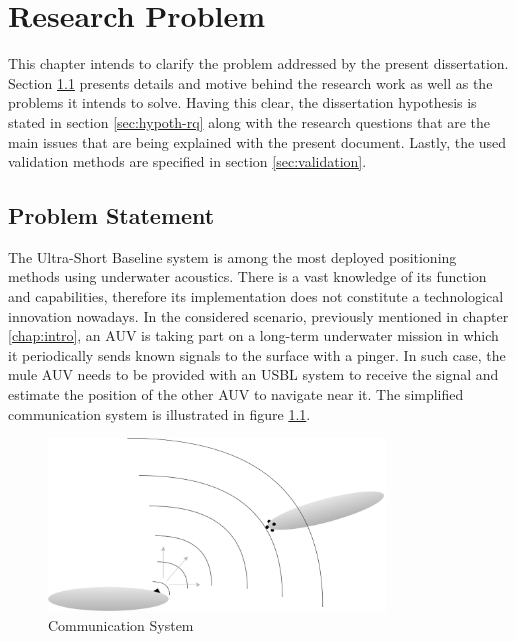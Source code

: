\chapter{Research Problem} \label{chap:problem}

This chapter intends to clarify the problem addressed by the present dissertation. Section \ref{sec:prob-state} presents details and motive behind the research work as well as the problems it intends to solve. Having this clear, the dissertation hypothesis is stated in section \ref{sec:hypoth-rq} along with the research questions that are the main issues that are being explained with the present document. Lastly, the used validation methods are specified in section \ref{sec:validation}.

\section{Problem Statement} \label{sec:prob-state}

The Ultra-Short Baseline system is among the most deployed positioning methods using underwater acoustics. There is a vast knowledge of its function and capabilities, therefore its implementation does not constitute a technological innovation nowadays. 
In the considered scenario, previously mentioned in chapter \ref{chap:intro}, an AUV is taking part on a long-term underwater mission in which it periodically sends known signals to the surface with a pinger. In such case, the mule AUV needs to be provided with an USBL system to receive the signal and estimate the position of the other AUV to navigate near it. The simplified communication system is illustrated in figure \ref{fig:auv_scene}. 

\begin{figure}[!htbp]
	\centering
	\includegraphics[width=0.8\textwidth]{figures/proposed-solution}
	\caption{Communication System}
	\label{fig:auv_scene}
\end{figure}

